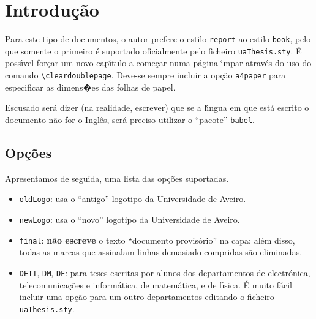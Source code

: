 \documentclass[11pt,twoside,a4paper]{report}
\begin{document}
%
%

\tableofcontents

\cleardoublepage
\listoffigures

\cleardoublepage
\listoftables



\cleardoublepage
{}
\chapter{Introdu\c c\~ao}

Para este tipo de documentos, o autor prefere o estilo \verb+report+ ao estilo \verb-book-,
pelo que somente o primeiro \'e suportado oficialmente pelo ficheiro \verb:uaThesis.sty:.
\'E poss\'\i vel for\c car um novo cap\'\i tulo a come\c car numa p\'agina \'\i mpar atrav\'es
do uso do comando \verb!\cleardoublepage!. Deve-se sempre incluir a op\c c\~ao \verb+a4paper+
para especificar as dimens�es das folhas de papel.

Escusado ser\'a dizer (na realidade, escrever) que se a l\'\i ngua em que est\'a escrito o
documento n\~ao for o Ingl\^es, ser\'a preciso utilizar o ``pacote'' \verb.babel..


\section{Op\c c\~oes}

Apresentamos de seguida, uma lista das op\c c\~oes suportadas.
\begin{itemize}
  \item \verb+oldLogo+: usa o ``antigo'' logotipo da Universidade de Aveiro.
  \item \verb+newLogo+: usa o ``novo'' logotipo da Universidade de Aveiro.
  \item \verb+final+: \textbf{n\~ao escreve} o texto ``documento provis\'orio'' na capa: al\'em
        disso, todas as marcas que assinalam linhas demasiado compridas s\~ao eliminadas.
  \item \verb+DETI+, \verb+DM+, \verb+DF+: para teses escritas por alunos dos departamentos de
        electr\'onica, telecomunica\c c\~oes e inform\'atica, de matem\'atica, e de f\'\i sica.
        \'E muito f\'acil incluir uma op\c c\~ao para um outro departamentos editando o
        ficheiro \verb+uaThesis.sty+.
\end{itemize}
\end{document}
